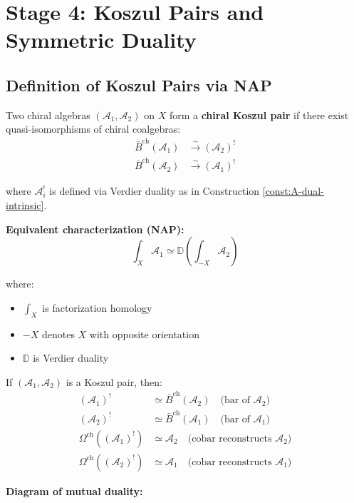 \section{Stage 4: Koszul Pairs and Symmetric Duality}

\subsection{Definition of Koszul Pairs via NAP}

\begin{definition}\label{def:koszul-pair-NAP}
Two chiral algebras $(\mathcal{A}_1, \mathcal{A}_2)$ on $X$ form a \textbf{chiral Koszul pair} if there exist quasi-isomorphisms of chiral coalgebras:
\begin{align}
\bar{B}^{\text{ch}}(\mathcal{A}_1) &\xrightarrow{\sim} (\mathcal{A}_2)^!\\
\bar{B}^{\text{ch}}(\mathcal{A}_2) &\xrightarrow{\sim} (\mathcal{A}_1)^!
\end{align}

where $\mathcal{A}_i^!$ is defined via Verdier duality as in Construction \ref{const:A-dual-intrinsic}.

\textbf{Equivalent characterization (NAP):}
$$\int_X \mathcal{A}_1 \simeq \mathbb{D}\left(\int_{-X} \mathcal{A}_2\right)$$

where:
\begin{itemize}
\item $\int_X$ is factorization homology
\item $-X$ denotes $X$ with opposite orientation
\item $\mathbb{D}$ is Verdier duality
\end{itemize}
\end{definition}

\begin{theorem}\label{thm:symmetric-koszul}
If $(\mathcal{A}_1, \mathcal{A}_2)$ is a Koszul pair, then:
\begin{align}
(\mathcal{A}_1)^! &\simeq \bar{B}^{\text{ch}}(\mathcal{A}_2) \quad \text{(bar of } \mathcal{A}_2)\\
(\mathcal{A}_2)^! &\simeq \bar{B}^{\text{ch}}(\mathcal{A}_1) \quad \text{(bar of } \mathcal{A}_1)\\
\Omega^{\text{ch}}((\mathcal{A}_1)^!) &\simeq \mathcal{A}_2 \quad \text{(cobar reconstructs } \mathcal{A}_2)\\
\Omega^{\text{ch}}((\mathcal{A}_2)^!) &\simeq \mathcal{A}_1 \quad \text{(cobar reconstructs } \mathcal{A}_1)
\end{align}

\textbf{Diagram of mutual duality:}
\begin{center}
\end{center}
\end{theorem}

